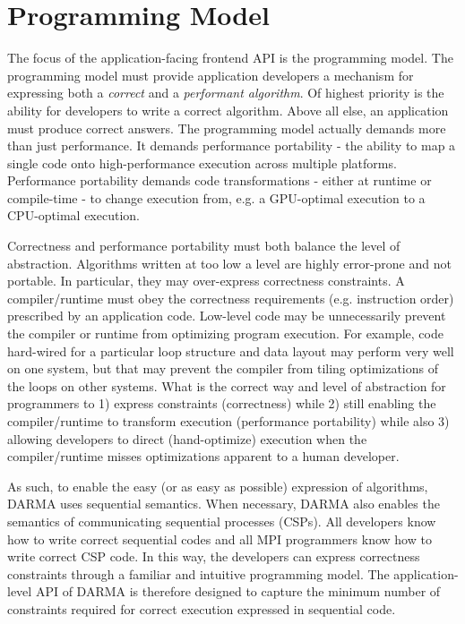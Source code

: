 
\section{Programming Model}
\label{sec:programming_model}
The focus of the application-facing frontend API is the programming model.
The programming model must provide application developers a mechanism for expressing both a \emph{correct} and a \emph{performant algorithm}.
Of highest priority is the ability for developers to write a correct algorithm.
Above all else, an application must produce correct answers.
The programming model actually demands more than just performance. 
It demands performance portability - the ability to map a single code onto high-performance execution across multiple platforms.
Performance portability demands code transformations - either at runtime or compile-time - to change execution from, e.g. a GPU-optimal execution to a CPU-optimal execution.

Correctness and performance portability must both balance the level of abstraction.
Algorithms written at too low a level are highly error-prone and not portable.
In particular, they may over-express correctness constraints.
A compiler/runtime must obey the correctness requirements (e.g. instruction order) prescribed by an application code.
Low-level code may be unnecessarily prevent the compiler or runtime from optimizing program execution.
For example, code hard-wired for a particular loop structure and data layout may perform very well on one system,
but that may prevent the compiler from tiling optimizations of the loops on other systems. 
What is the correct way and level of abstraction for programmers to 1) express constraints (correctness) while 2) still enabling the compiler/runtime to transform execution (performance portability) while also 3) allowing developers to direct (hand-optimize) execution when the compiler/runtime misses optimizations apparent to a human developer. 

As such, to enable the easy (or as easy as possible) expression of algorithms, DARMA uses sequential semantics.
When necessary, DARMA also enables the semantics of communicating sequential processes (CSPs).
All developers know how to write correct sequential codes and all MPI programmers know how to write correct CSP code.
In this way, the developers can express correctness constraints through a familiar and intuitive programming model.
The application-level API of DARMA is therefore designed to capture the minimum number of constraints required for correct execution expressed in sequential code.

